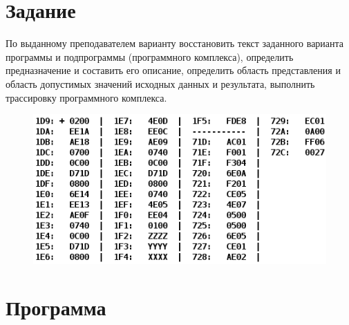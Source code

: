

\section{Задание}
По выданному преподавателем варианту восстановить текст заданного варианта программы и подпрограммы
(программного комплекса), определить предназначение и составить его описание, определить область представления и область
допустимых значений исходных данных и результата, выполнить трассировку программного комплекса.


\begin{figure}[H]
    \centering
    \includegraphics[scale=0.6]{img/variant}
\end{figure}


\section{Программа}

